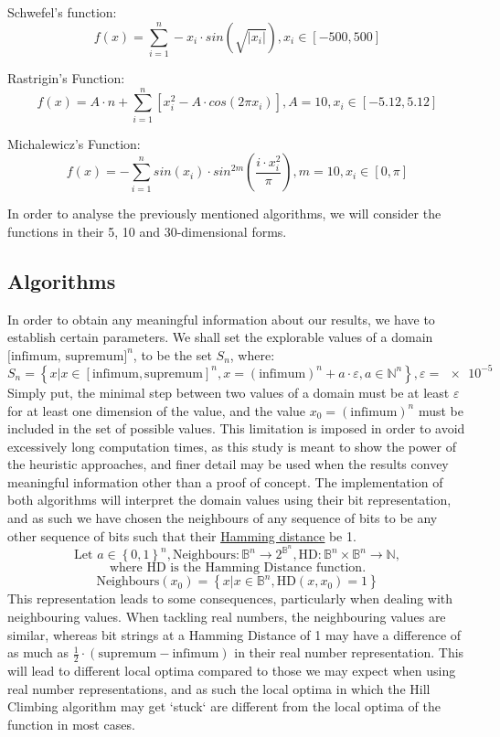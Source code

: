 \documentclass{article}
\begin{document}
Schwefel's function:
$$ f(x) = \sum_{i = 1}^n -x_i \cdot sin\left(\sqrt{\left|x_i\right|}\right), 
x_i \in \left[ -500, 500 \right] $$

Rastrigin's Function:
$$ f(x) = A \cdot n + \sum_{i=1}^n \left[ x_i^2 - A \cdot cos(2 \pi x_i) \right],
A = 10, x_i \in \left[ -5.12, 5.12 \right]$$

Michalewicz's Function:
$$ f(x) = - \sum_{i=1}^n sin(x_i) \cdot sin^{2m}\left(\frac{i \cdot x_i^2}{\pi}\right),
m = 10, x_i \in \left[ 0, \pi \right]$$

In order to analyse the previously mentioned algorithms, we will consider the functions in their 5, 10 and 30-dimensional forms.

\subsection{Algorithms}
In order to obtain any meaningful information about our results, we have to establish certain parameters. We shall set the explorable values of a domain $\text{[infimum, supremum]}^n$, to be the set $S_n$, where:
$$ S_n = \left\{ x | x \in [\text{infimum}, \text{supremum}]^n, x = (\text{infimum})^n + a \cdot \varepsilon, a \in \mathbb{N}^n \right\}, \varepsilon = \num{e-5} $$
Simply put, the minimal step between two values of a domain must be at least $\varepsilon$ for at least one dimension of the value, and the value $ x_0 = (\text{infimum})^n $ must be included in the set of possible values. This limitation is imposed in order to avoid excessively long computation times, as this study is meant to show the power of the heuristic approaches, and finer detail may be used when the results convey meaningful information other than a proof of concept.
The implementation of both algorithms will interpret the domain values using their bit representation, and as such we have chosen the neighbours of any sequence of bits to be any other sequence of bits such that their \underline{\href{https://en.wikipedia.org/wiki/Hamming_distance}{Hamming distance}}\cite{HD} be 1.
$$ \text{Let } a \in \left\{0, 1\right\}^n,
\text{Neighbours} \colon \mathbb{B}^n \to 2^{\mathbb{B}^n},
\text{HD}:\mathbb{B}^n \times \mathbb{B}^n \to \mathbb{N},$$ $$\text{where HD is the Hamming Distance function.}$$
$$ \text{Neighbours}\left(x_0\right) = \left\{x | x \in \mathbb{B}^n, \text{HD}\left(x, x_0\right) = 1  \right\} $$
This representation leads to some consequences, particularly when dealing with neighbouring values. When tackling real numbers, the neighbouring values are similar, whereas bit strings at a Hamming Distance of 1 may have a difference of as much as $ \frac{1}{2}\cdot\left(\text{supremum} - \text{infimum}\right)$ in their real number representation. This will lead to different local optima compared to those we may expect when using real number representations, and as such the local optima in which the Hill Climbing algorithm may get `stuck` are different from the local optima of the function in most cases. \\
\end{document}
